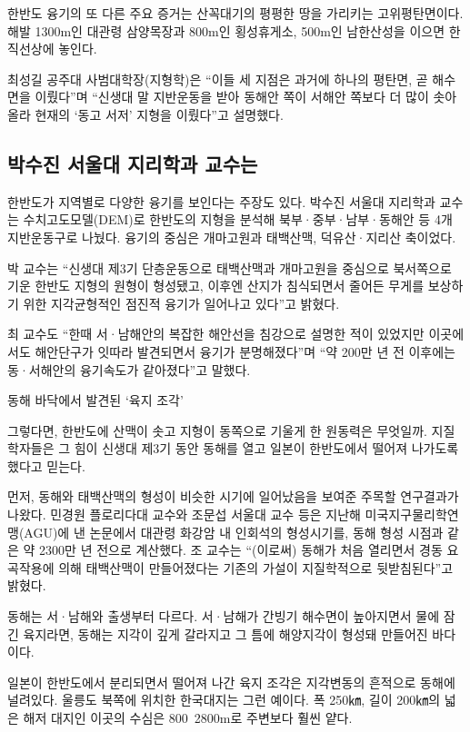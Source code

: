\documentclass[12pt,a4paper]{book}
\begin{document}
		한반도 융기의 또 다른 주요 증거는 산꼭대기의 평평한 땅을 가리키는 고위평탄면이다. 
		해발 1300m인 대관령 삼양목장과 800m인 횡성휴게소, 500m인 남한산성을 이으면 한 직선상에 놓인다.
 
		최성길 공주대 사범대학장(지형학)은 “이들 세 지점은 과거에 하나의 평탄면, 
		곧 해수면을 이뤘다”며 “신생대 말 지반운동을 받아 동해안 쪽이 서해안 쪽보다 더 많이 솟아올라 현재의 ‘동고 서저’ 지형을 이뤘다”고 설명했다.
		\\[-1.0em]

 
		\subsection{박수진 서울대 지리학과 교수는 }
		한반도가 지역별로 다양한 융기를 보인다는 주장도 있다. 
		박수진 서울대 지리학과 교수는 수치고도모델(DEM)로 한반도의 지형을 분석해 북부·중부·남부·동해안 등 4개 지반운동구로 나눴다. 
		융기의 중심은 개마고원과  태백산맥, 덕유산·지리산 축이었다.
 
		박 교수는 “신생대 제3기 단층운동으로 태백산맥과 개마고원을 중심으로 북서쪽으로 기운 한반도 지형의 원형이 형성됐고, 
		이후엔 산지가 침식되면서 줄어든 무게를 보상하기 위한 지각균형적인 점진적 융기가 일어나고 있다”고 밝혔다.
 
		최 교수도 “한때 서·남해안의 복잡한 해안선을 침강으로 설명한 적이 있었지만 
		이곳에서도 해안단구가 잇따라 발견되면서 융기가 분명해졌다”며 “약 200만 년 전 이후에는 동·서해안의 융기속도가 같아졌다”고 말했다.
 


		동해 바닥에서 발견된 ‘육지 조각’
 
		그렇다면, 한반도에 산맥이 솟고 지형이 동쪽으로 기울게 한 원동력은 무엇일까. 
		지질학자들은 그 힘이 신생대 제3기 동안 동해를 열고 일본이 한반도에서 떨어져 나가도록 했다고 믿는다.
 
		먼저, 동해와 태백산맥의 형성이 비슷한 시기에 일어났음을 보여준 주목할 연구결과가 나왔다. 
		민경원 플로리다대 교수와 조문섭 서울대 교수 등은 지난해 미국지구물리학연맹(AGU)에 낸 논문에서 
		대관령 화강암 내 인회석의 형성시기를, 동해 형성 시점과 같은 약 2300만 년 전으로 계산했다. 
		조 교수는 “(이로써) 동해가 처음 열리면서 경동 요곡작용에 의해 태백산맥이 만들어졌다는 기존의 가설이 지질학적으로 뒷받침된다”고 밝혔다.
 
		동해는 서·남해와 출생부터 다르다. 
		서·남해가 간빙기 해수면이 높아지면서 물에 잠긴 육지라면, 동해는 지각이 깊게 갈라지고 그 틈에 해양지각이 형성돼 만들어진 바다이다.
 
		일본이 한반도에서 분리되면서 떨어져 나간 육지 조각은 지각변동의 흔적으로 동해에 널려있다. 
		울릉도 북쪽에 위치한 한국대지는 그런 예이다. 
		폭 250㎞, 길이 200㎞의 넓은 해저 대지인 이곳의 수심은 800~2800m로 주변보다 훨씬 얕다.
 
\end{document}
